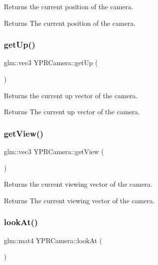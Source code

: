 Returns the current position of the camera. 

\begin{DoxyReturn}{Returns}
The current position of the camera. 
\end{DoxyReturn}
\mbox{\label{class_y_p_r_camera_a3441eafb88882eb670d7eeb8bdc433fc}} 
\subsubsection{\texorpdfstring{get\+Up()}{getUp()}}
{\footnotesize\ttfamily glm\+::vec3 Y\+P\+R\+Camera\+::get\+Up (\begin{DoxyParamCaption}{ }\end{DoxyParamCaption})}



Returns the current up vector of the camera. 

\begin{DoxyReturn}{Returns}
The current up vector of the camera. 
\end{DoxyReturn}
\mbox{\label{class_y_p_r_camera_ad30888384ec6b348403c85ad0aef83c9}} 
\subsubsection{\texorpdfstring{get\+View()}{getView()}}
{\footnotesize\ttfamily glm\+::vec3 Y\+P\+R\+Camera\+::get\+View (\begin{DoxyParamCaption}{ }\end{DoxyParamCaption})}



Returns the current viewing vector of the camera. 

\begin{DoxyReturn}{Returns}
The current viewing vector of the camera. 
\end{DoxyReturn}
\mbox{\label{class_y_p_r_camera_a6312430157dfe879afee0af5f7759a87}} 
\subsubsection{\texorpdfstring{look\+At()}{lookAt()}}
{\footnotesize\ttfamily glm\+::mat4 Y\+P\+R\+Camera\+::look\+At (\begin{DoxyParamCaption}{ }\end{DoxyParamCaption})}



